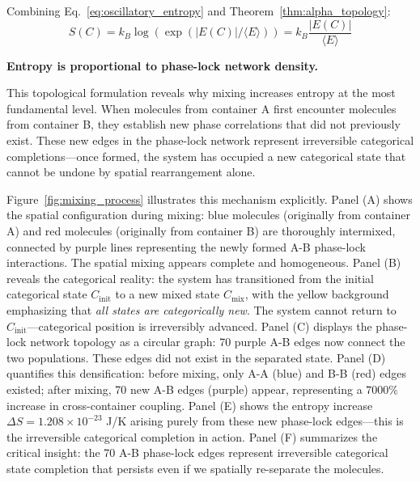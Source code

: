 Combining Eq.~\eqref{eq:oscillatory_entropy} and Theorem~\ref{thm:alpha_topology}:
\begin{equation}
S(C) = k_B \log(\exp(|E(C)|/\langle E \rangle)) = k_B \frac{|E(C)|}{\langle E \rangle}
\label{eq:topological_entropy}
\end{equation}

\textbf{Entropy is proportional to phase-lock network density.}

This topological formulation reveals why mixing increases entropy at the most fundamental level. When molecules from container A first encounter molecules from container B, they establish new phase correlations that did not previously exist. These new edges in the phase-lock network represent irreversible categorical completions—once formed, the system has occupied a new categorical state that cannot be undone by spatial rearrangement alone.

Figure~\ref{fig:mixing_process} illustrates this mechanism explicitly. Panel (A) shows the spatial configuration during mixing: blue molecules (originally from container A) and red molecules (originally from container B) are thoroughly intermixed, connected by purple lines representing the newly formed A-B phase-lock interactions. The spatial mixing appears complete and homogeneous. Panel (B) reveals the categorical reality: the system has transitioned from the initial categorical state $C_{\text{init}}$ to a new mixed state $C_{\text{mix}}$, with the yellow background emphasizing that \emph{all states are categorically new}. The system cannot return to $C_{\text{init}}$—categorical position is irreversibly advanced. Panel (C) displays the phase-lock network topology as a circular graph: 70 purple A-B edges now connect the two populations. These edges did not exist in the separated state. Panel (D) quantifies this densification: before mixing, only A-A (blue) and B-B (red) edges existed; after mixing, 70 new A-B edges (purple) appear, representing a $7000\%$ increase in cross-container coupling. Panel (E) shows the entropy increase $\Delta S = 1.208 \times 10^{-23}$ J/K arising purely from these new phase-lock edges—this is the irreversible categorical completion in action. Panel (F) summarizes the critical insight: the 70 A-B phase-lock edges represent irreversible categorical state completion that persists even if we spatially re-separate the molecules.

